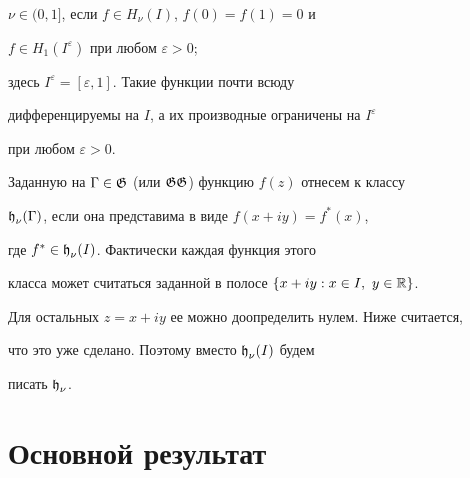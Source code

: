 $\nu\in (0,1]$, если $f\in H_{\nu}(I)$, $f(0)=f(1)=0$ и


$f\in H_{1}(I^\varepsilon)$ при любом $\varepsilon > 0$;


здесь $I^\varepsilon = [\varepsilon, 1]$. Такие функции почти всюду


дифференцируемы на $I$, а их производные ограничены на $I^\varepsilon$


при любом $\varepsilon > 0$.





Заданную на $\Gamma\in\operatorname{\frak G}$ (или $\operatorname{\frak G\frak G}$) функцию $f(z)$ отнесем к классу


$\operatorname{\frak h}_{\nu}(\Gamma)$, если она представима в виде $f(x+iy) = f^{*}(x)$,


где $f^{*} \in \operatorname{\frak h}_{\nu}(I)$. Фактически каждая функция этого


класса может считаться заданной в полосе $\{x+iy:x\in I,\ y\in {\Bbb R}\}$.


Для остальных $z=x+iy$ ее можно доопределить нулем. Ниже считается,


что это уже сделано. Поэтому вместо $\operatorname{\frak h}_{\nu}(I)$ будем


писать $\operatorname{\frak h}_{\nu}$.





\section{Основной результат}





